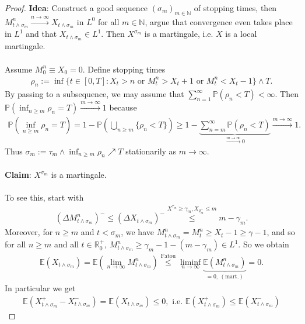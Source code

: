 \documentclass[12pt,a4paper, twoside]{article}
\theoremstyle{definition}
\newcommand{\EE}{\mathbb{E}} %
\newcommand{\PP}{\mathbb{P}} %
\begin{document}
\begin{proof}
\textbf{Idea}: Construct a good sequence $(\sigma_m)_{m \in \mathbb{N}}$ of stopping times, then $M_{t \wedge \sigma_m}^n \xrightarrow{n \to \infty} X_{t \wedge \sigma_m}$ in $L^0$ for all $m \in \mathbb{N}$, argue that convergence even takes place in $L^1$ and that $X_{t \wedge \sigma_m} \in L^1$. Then $X^{\sigma_m}$ is a martingale, i.e. $X$ is a local martingale. 
\\\\
Assume $M_0^n \equiv X_0 =0$. Define stopping times 
\begin{align*}
\rho_n := \inf \{ t \in [0,T]: X_t >n \text{ or } M_t^n > X_t+1 \text{ or } M_t^n < X_t-1 \} \wedge T.
\end{align*}
By passing to a subsequence, we may assume that $\sum_{n=1}^\infty \PP( \rho_n < T)  <\infty$. Then $\PP( \inf_{n \geq m} \rho_n =T) \xrightarrow{m \to \infty} 1$ because 
\begin{align*}
\PP( \inf_{n \geq m} \rho_n = T)= 1- \PP \left( \bigcup_{n \geq m } \{ \rho_n < T \} \right) \geq 1 - \underbrace{\sum_{n = m}^\infty \PP( \rho_n < T)}_{ \xrightarrow{m \to \infty}0 } \xrightarrow{m \to \infty} 1.
\end{align*}
Thus $\sigma_m := \tau_m \wedge \inf_{n \geq m} \rho_n \nearrow T$ stationarily as $m \to \infty$. 
\\\\
\textbf{Claim}: $X^{\sigma_m}$ is a martingale. 
\\\\
To see this, start with 
\begin{align*}
( \Delta M_{t \wedge \sigma_m}^n)^- \leq ( \Delta X_{t \wedge \sigma_m})^- \overset{X^{\tau_m} \geq \gamma_m, X_{\rho_m^-} \leq m } \leq m- \gamma_m.
\end{align*}
Moreover, for $n \geq m$ and $t < \sigma_m$, we have $M_{t \wedge \sigma_m}^n = M_t^n \geq X_t-1 \geq \gamma-1$, and so for all $n \geq m$ and all $t \in \mathbb{R}_0^+$, $M_{t \wedge \sigma_m}^n \geq \gamma_m-1-(m-\gamma_m) \in L^1$. So we obtain 
\begin{align*}
\EE( X_{t \wedge \sigma_m}) = \EE( \lim_{n \to \infty} M_{t \wedge \sigma_m}^n) \overset{\text{Fatou}} \leq \liminf_{n \to \infty} \underbrace{\EE( M_{t \wedge \sigma_m}^n)}_{=0,\ (\text{mart.})}=0.
\end{align*}
In particular we get
\begin{align*}
\EE(X_{t \wedge \sigma_m}^+ - X_{t \wedge \sigma_m}^-) = \EE(X_{t \wedge \sigma_m}) \leq 0, \text{ i.e. } \EE( X_{t \wedge \sigma_m}^+) \leq \EE( X_{t \wedge \sigma_m}^-)

\end{align*}
\end{proof}
\end{document}

